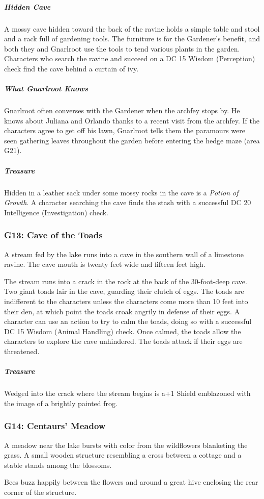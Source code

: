 \documentclass[10pt,a4paper,twoside,bg=print,twocolumn,openany,nodeprecatedcode]{dndbook}
\begin{document}
\subparagraph{Hidden Cave}
A mossy cave hidden toward the back of the ravine holds a simple table and stool and a rack full of gardening tools. The furniture is for the Gardener's benefit, and both they and Gnarlroot use the tools to tend various plants in the garden. Characters who search the ravine and succeed on a DC 15 Wisdom (Perception) check find the cave behind a curtain of ivy.

\subparagraph{What Gnarlroot Knows}
Gnarlroot often converses with the Gardener when the archfey stops by. He knows about Juliana and Orlando thanks to a recent visit from the archfey. If the characters agree to get off his lawn, Gnarlroot tells them the paramours were seen gathering leaves throughout the garden before entering the hedge maze (area G21).

\subparagraph{Treasure}
Hidden in a leather sack under some mossy rocks in the cave is a \textit{Potion of Growth}. A character searching the cave finds the stash with a successful DC 20 Intelligence (Investigation) check.

\subsubsection{G13: Cave of the Toads}
\begin{DndReadAloud}{}
A stream fed by the lake runs into a cave in the southern wall of a limestone ravine. The cave mouth is twenty feet wide and fifteen feet high.

\end{DndReadAloud}

The stream runs into a crack in the rock at the back of the 30-foot-deep cave. Two giant toads lair in the cave, guarding their clutch of eggs. The toads are indifferent to the characters unless the characters come more than 10 feet into their den, at which point the toads croak angrily in defense of their eggs. A character can use an action to try to calm the toads, doing so with a successful DC 15 Wisdom (Animal Handling) check. Once calmed, the toads allow the characters to explore the cave unhindered. The toads attack if their eggs are threatened.

\subparagraph{Treasure}
Wedged into the crack where the stream begins is a+1 Shield emblazoned with the image of a brightly painted frog.

\subsubsection{G14: Centaurs' Meadow}
\begin{DndReadAloud}{}
A meadow near the lake bursts with color from the wildflowers blanketing the grass. A small wooden structure resembling a cross between a cottage and a stable stands among the blossoms.

Bees buzz happily between the flowers and around a great hive enclosing the rear corner of the structure.

\end{DndReadAloud}
\end{document}
